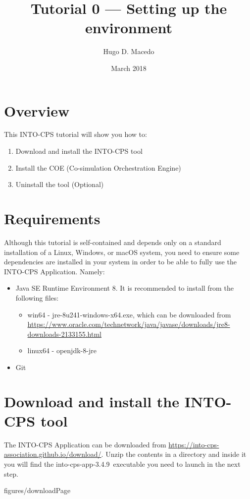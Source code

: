 \documentclass[11pt,a4paper]{../tutorial}
\title{Tutorial 0 --- Setting up the environment}
\date{March 2018}
\author{Hugo D. Macedo}
\def\intocpsVer{3.4.9}
\newcommand{\JavaURL}{https://www.oracle.com/technetwork/java/javase/downloads/jre8-downloads-2133155.html}
\newcommand{\JavaWinVer}{jre-8u241-windows-x64.exe}
\begin{document}
\section*{Overview}

This INTO-CPS tutorial will show you how to:

\begin{enumerate}[noitemsep]
\item Download and install the INTO-CPS tool
\item Install the COE (Co-simulation Orchestration Engine)
\item Uninstall the tool (Optional) 
\end{enumerate}

\section*{Requirements}

Although this tutorial is self-contained and depends only on a standard
installation of a Linux, Windows, or macOS system, you need to ensure some
dependencies are installed in your system in order to be able to fully use the
INTO-CPS Application. Namely: 

\begin{itemize}[noitemsep]
	\item Java SE Runtime Environment 8. It is recommended to install from the following files: 
	\begin{itemize}
	\item win64 - \JavaWinVer, which can be downloaded from \url{\JavaURL} 
	\item linux64 - openjdk-8-jre
	\end{itemize}
\item Git
\end{itemize}


\section{Download and install the INTO-CPS tool}


\begin{instructions} 

\item The INTO-CPS Application can be downloaded from
	\url{https://into-cps-association.github.io/download/}. Unzip the
	contents in a directory and inside it you will find the into-cps-app-\intocpsVer\
	executable you need to launch in the next step. 
	
	\begin{annotation}[width=0.85\linewidth]{figures/downloadPage}
	\end{annotation}

\end{instructions}
\end{document}
